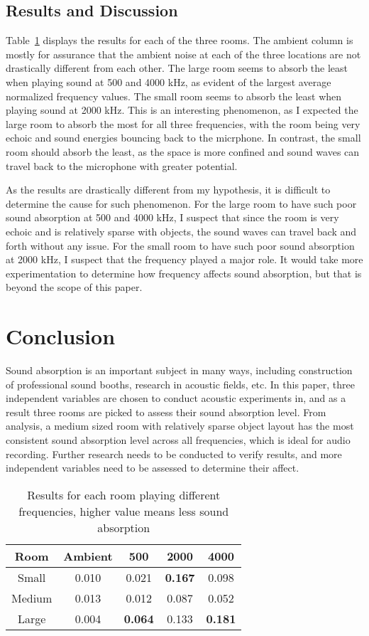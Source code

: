 \documentclass[12pt,onecolumn,letterpaper,draftclsnofoot]{article}
\newcommand{\tabref}[1]{Table~\ref{tab:#1}}
\begin{document}
\subsection{Results and Discussion}
\tabref{results} displays the results for each of the three rooms. The ambient
column is mostly for assurance that the ambient noise at each of the three
locations are not drastically different from each other. The large room seems
to absorb the least when playing sound at 500 and 4000 kHz, as evident of the
largest average normalized frequency values. The small room seems to absorb
the least when playing sound at 2000 kHz. This is an interesting phenomenon,
as I expected the large room to absorb the most for all three frequencies,
with the room being very echoic and sound energies bouncing back to the
micrphone. In contrast, the small room should absorb the least, as the space
is more confined and sound waves can travel back to the microphone with
greater potential.

As the results are drastically different from my hypothesis, it is difficult
to determine the cause for such phenomenon. For the large room to have such
poor sound absorption at 500 and 4000 kHz, I suspect that since the room is
very echoic and is relatively sparse with objects, the sound waves can travel
back and forth without any issue. For the small room to have such poor sound
absorption at 2000 kHz, I suspect that the frequency played a major role. It
would take more experimentation to determine how frequency affects sound
absorption, but that is beyond the scope of this paper.

\section{Conclusion}
Sound absorption is an important subject in many ways, including construction
of professional sound booths, research in acoustic fields, etc. In this paper,
three independent variables are chosen to conduct acoustic experiments in, and
as a result three rooms are picked to assess their sound absorption level.
From analysis, a medium sized room with relatively sparse object layout has
the most consistent sound absorption level across all frequencies, which is
ideal for audio recording. Further research needs to be conducted to verify
results, and more independent variables need to be assessed to determine their
affect.

\begin{table}[]
\centering
\caption{Results for each room playing different frequencies, higher value
  means less sound absorption}
\label{tab:results}
\begin{tabular}{ccccc}
	\toprule
	Room   & Ambient & 500            & 2000           & 4000           \\
  \hline
	Small  & 0.010   & 0.021          & \textbf{0.167} & 0.098          \\
	Medium & 0.013   & 0.012          & 0.087          & 0.052          \\
	Large  & 0.004   & \textbf{0.064} & 0.133          & \textbf{0.181}
	\bottomrule
\end{tabular}
\end{table}

{\small


}
\end{document}
